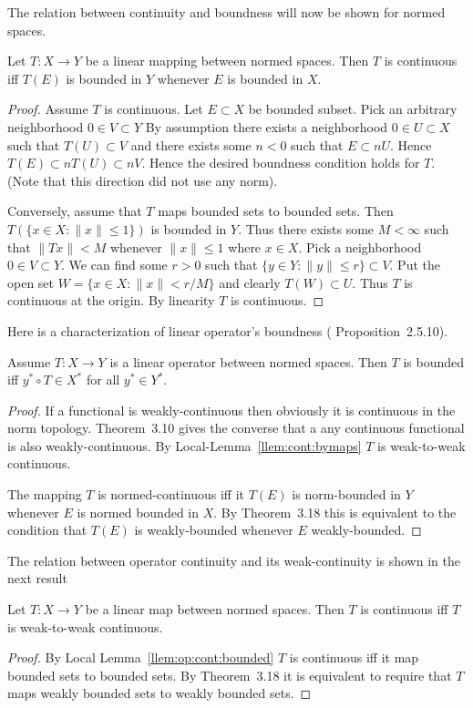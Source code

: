 The relation between continuity and boundness
will now be shown for normed spaces.
\begin{llem} \label{llem:op:cont:bounded}
Let \(T:X \to Y\) be a linear mapping between normed spaces.
Then $T$ is continuous iff \(T(E)\) is bounded in $Y$ whenever $E$
is bounded in $X$.
\end{llem}
\begin{proof}
Assume $T$ is continuous.
Let \(E\subset X\) be bounded subset.
Pick an arbitrary neighborhood \(0\in V \subset Y\)
By assumption there exists a neighborhood \(0 \in U \subset X\)
such that \(T(U) \subset V\) and there exists some \(n < 0\) such that
\(E \subset nU\). Hence 
\(T(E) \subset nT(U) \subset nV\). Hence the desired boundness condition 
holds for $T$. (Note that this direction did not use any norm).

Conversely, assume that $T$ maps bounded sets to bounded sets.
Then \(T(\{x\in X: \|x\| \leq 1\})\) is bounded in $Y$.
Thus there exists some \(M < \infty\) such that
\(\|Tx\| < M\) whenever \(\|x\| \leq 1\) where \(x \in X\).
Pick a neighborhood \(0\in V \subset Y\).
We can find some \(r > 0\) such that \(\{y\in Y: \|y\| \leq r\} \subset V\).
Put the open set \(W = \{x \in X: \|x\| < r/M\}\) and clearly
\(T(W) \subset U\). Thus $T$ is continuous at the origin.
By linearity $T$ is continuous.
\end{proof}


Here is a characterization of linear operator's boundness
(\cite{Megginson1998} Proposition~2.5.10).
\begin{llem}
Assume \(T:X \to Y\) is a linear operator between normed spaces.
Then $T$ is bounded  iff \(y^* \circ T \in X^*\) for all \(y^*\in Y^*\).
\end{llem}
\begin{proof}
If a functional is weakly-continuous then obviously it is
continuous in the norm topology. Theorem~3.10  gives the converse
that a any continuous functional is also weakly-continuous.
By Local-Lemma~\ref{llem:cont:bymaps} $T$ is weak-to-weak continuous.

The mapping $T$ is normed-continuous iff it \(T(E)\) is norm-bounded
in $Y$ whenever $E$ is normed bounded in $X$.
By Theorem~3.18 this is equivalent 
to the condition that \(T(E)\) is weakly-bounded
whenever $E$ weakly-bounded.
\end{proof}

The relation between operator continuity and its weak-continuity
is shown in the next result
\begin{llem} \label{llem:weak:to:weak}
Let \(T:X \to Y\) be a linear map between normed spaces.
Then $T$ is continuous iff $T$ is weak-to-weak continuous.
\end{llem}
\begin{proof}
By Local Lemma~\ref{llem:op:cont:bounded}
$T$ is continuous iff it map bounded sets to bounded sets.
By Theorem~3.18 it is equivalent to
require that $T$ maps weakly bounded sets to weakly bounded sets.
\end{proof}


